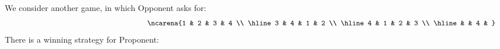 \documentclass{lipics-v2021}
\begin{document}
We consider another game, in which Opponent asks for:
    \[ {\small
    \hspace{5.5cm}\ncarena{1 & 2 & 3 & 4 \\ \hline 3 & 4 & 1 & 2 \\ \hline 4 & 1 & 2 & 3 \\ \hline  &  & 4 & } }
    \]
There is a winning strategy for Proponent:
\end{document}
